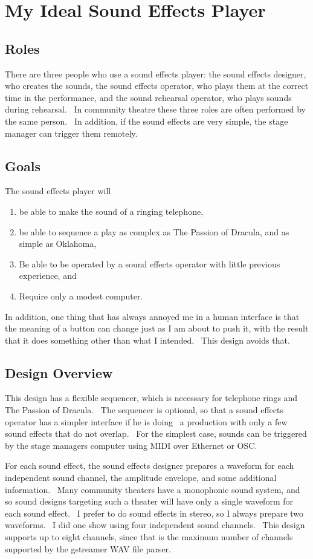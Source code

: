 \documentclass[letterpaper]{article}
\title{}
\author{John Sauter}
\date{2015-01-04T15:14:15.467341557}
\newcommand\liststyleLv{%
\renewcommand\theenumi{\arabic{enumi}}
\renewcommand\theenumii{\arabic{enumii}}
\renewcommand\theenumiii{\arabic{enumiii}}
\renewcommand\theenumiv{\arabic{enumiv}}
\renewcommand\labelenumi{\theenumi.}
\renewcommand\labelenumii{\theenumii.}
\renewcommand\labelenumiii{\theenumiii.}
\renewcommand\labelenumiv{\theenumiv.}
}
\begin{document}
\section{My Ideal Sound Effects Player}
\subsection{Roles}
There are three people who use a sound effects player: the sound effects
designer, who creates the sounds, the sound effects operator, who plays
them at the correct time in the performance, and the sound rehearsal
operator, who plays sounds during rehearsal. \ In community theatre
these three roles are often performed by the same person. \ In
addition, if the sound effects are very simple, the stage manager can
trigger them remotely.

\subsection{Goals}
The sound effects player will

\liststyleLv
\begin{enumerate}
\item be able to make the sound of a ringing telephone,
\item be able to sequence a play as complex as The Passion of Dracula,
and as simple as Oklahoma,
\item Be able to be operated by a sound effects operator with little
previous experience, and
\item Require only a modest computer.
\end{enumerate}
In addition, one thing that has always annoyed me in a human interface
is that the meaning of a button can change just as I am about to push
it, with the result that it does something other than what I intended.
\ This design avoids that.

\subsection{Design Overview}
This design has a flexible sequencer, which is necessary for telephone
rings and The Passion of Dracula. \ The sequencer is optional, so that
a sound effects operator has a simpler interface if he is doing \ a
production with only a few sound effects that do not overlap. \ For the
simplest case, sounds can be triggered by the stage
manager{\textquotesingle}s computer using MIDI over Ethernet or OSC.

For each sound effect, the sound effects designer prepares a waveform
for each independent sound channel, the amplitude envelope, and some
additional information. \ Many community theaters have a monophonic
sound system, and so sound designs targeting such a theater will have
only a single waveform for each sound effect. \ I prefer to do sound
effects in stereo, so I always prepare two waveforms. \ I did one show
using four independent sound channels. \ This design supports up to
eight channels, since that is the maximum number of channels supported
by the gstreamer WAV file parser.
\end{document}
